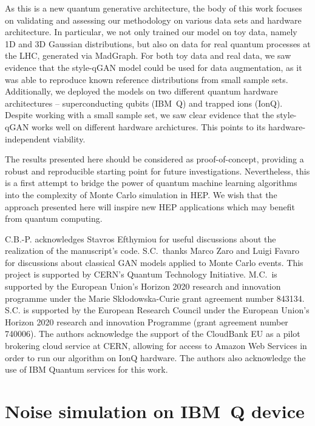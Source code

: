 \documentclass[twocolumn,preprintnumbers,superscriptaddress]{revtex4-2}
\begin{document}
As this is a new quantum generative architecture, the body of this work focuses on validating and assessing our methodology on various data sets and hardware architecture. In particular, we not only trained our model on toy data, namely 1D and 3D Gaussian distributions, but also on data for real quantum processes at the LHC, generated via MadGraph. For both toy data and real data, we saw evidence that the style-qGAN model could be used for data augmentation, as it was able to reproduce known reference distributions from small sample sets. Additionally, we deployed the models on two different quantum hardware architectures -- superconducting qubits (IBM~Q) and trapped ions (IonQ). Despite working with a small sample set, we saw clear evidence that the style-qGAN works well on different hardware archictures. This points to its hardware-independent viability. 

The results presented here should be considered as proof-of-concept, providing a robust and reproducible starting point for future investigations. Nevertheless, this is a first attempt to bridge the power of quantum machine learning algorithms into the complexity of Monte Carlo simulation in HEP. We wish that the approach presented here will inspire new HEP applications which may benefit from quantum computing.\acknowledgments

C.B.-P. acknowledges Stavros Efthymiou for useful discussions about the
realization of the manuscript's code. S.C.~thanks Marco Zaro and Luigi Favaro for
discussions about classical GAN models applied to Monte Carlo events. This
project is supported by CERN's Quantum Technology Initiative. 
M.C.\ is supported by the European Union’s Horizon 2020 research and innovation programme under the Marie Skłodowska-Curie grant agreement number 843134.
S.C. is supported by the European Research
Council under the European Union's Horizon 2020 research and innovation
Programme (grant agreement number 740006). The authors acknowledge the support of the CloudBank EU as a pilot brokering cloud service at CERN, allowing
 for access to Amazon Web Services in order to run our algorithm on IonQ hardware. The authors also acknowledge the use of IBM Quantum services for this work.


 
\appendix

\section{Noise simulation on IBM~Q device}
\label{sec:appendixnoise}
\end{document}
